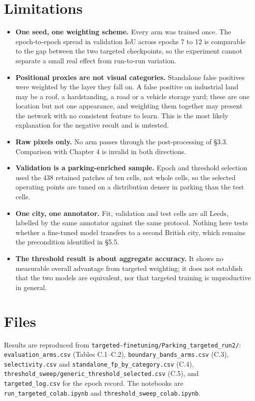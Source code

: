 \hypertarget{limitations}{%
\section{Limitations}\label{limitations}}

\begin{itemize}
\tightlist
\item
  \textbf{One seed, one weighting scheme.} Every arm was trained once. The epoch-to-epoch spread in validation IoU across epochs 7 to 12 is comparable to the gap between the two targeted checkpoints, so the experiment cannot separate a small real effect from run-to-run variation.
\item
  \textbf{Positional proxies are not visual categories.} Standalone false positives were weighted by the layer they fall on. A false positive on industrial land may be a roof, a hardstanding, a road or a vehicle storage yard; these are one location but not one appearance, and weighting them together may present the network with no consistent feature to learn. This is the most likely explanation for the negative result and is untested.
\item
  \textbf{Raw pixels only.} No arm passes through the post-processing of §3.3. Comparison with Chapter 4 is invalid in both directions.
\item
  \textbf{Validation is a parking-enriched sample.} Epoch and threshold selection used the 438 retained patches of ten cells, not whole cells, so the selected operating points are tuned on a distribution denser in parking than the test cells.
\item
  \textbf{One city, one annotator.} Fit, validation and test cells are all Leeds, labelled by the same annotator against the same protocol. Nothing here tests whether a fine-tuned model transfers to a second British city, which remains the precondition identified in §5.5.
\item
  \textbf{The threshold result is about aggregate accuracy.} It shows no measurable overall advantage from targeted weighting; it does not establish that the two models are equivalent, nor that targeted training is unproductive in general.
\end{itemize}

\hypertarget{files}{%
\section{Files}\label{files}}

Results are reproduced from \texttt{targeted-\allowbreak{}finetuning/\allowbreak{}Parking\_\allowbreak{}targeted\_\allowbreak{}run2/\allowbreak{}}: \texttt{evaluation\_\allowbreak{}arms.\allowbreak{}csv} (Tables C.1--C.2), \texttt{boundary\_\allowbreak{}bands\_\allowbreak{}arms.\allowbreak{}csv} (C.3), \texttt{selectivity.csv} and \texttt{standalone\_\allowbreak{}fp\_\allowbreak{}by\_\allowbreak{}category.\allowbreak{}csv} (C.4), \texttt{threshold\_\allowbreak{}sweep/\allowbreak{}generic\_\allowbreak{}threshold\_\allowbreak{}selected.\allowbreak{}csv} (C.5), and \texttt{targeted\_\allowbreak{}log.\allowbreak{}csv} for the epoch record. The notebooks are \texttt{run\_\allowbreak{}targeted\_\allowbreak{}colab.\allowbreak{}ipynb} and \texttt{threshold\_\allowbreak{}sweep\_\allowbreak{}colab.\allowbreak{}ipynb}.
